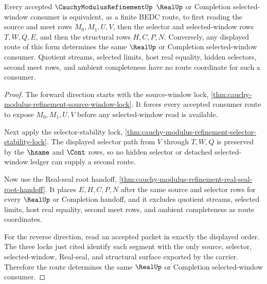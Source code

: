 \begin{theorem}
\label{thm:cauchy-modulus-refinement-root-window-exhaustion}
Every accepted $\CauchyModulusRefinementUp$ $\RealUp$ or Completion selected-window consumer is equivalent, as a finite BEDC route, to first reading the source and meet rows $M_0,M_1,U,V$, then the selector and selected-window rows $T,W,Q,E$, and then the structural rows $H,C,P,N$. Conversely, any displayed route of this form determines the same $\RealUp$ or Completion selected-window consumer. Quotient streams, selected limits, host real equality, hidden selectors, second meet rows, and ambient completeness have no route coordinate for such a consumer.
\end{theorem}
\begin{proof}
The forward direction starts with the source-window lock, \autoref{thm:cauchy-modulus-refinement-source-window-lock}. It forces every accepted consumer route to expose $M_0,M_1,U,V$ before any selected-window read is available.

Next apply the selector-stability lock, \autoref{thm:cauchy-modulus-refinement-selector-stability-lock}. The displayed selector path from $V$ through $T,W,Q$ is preserved by the $\hsame$ and $\Cont$ rows, so no hidden selector or detached selected-window ledger can supply a second route.

Now use the Real-seal root handoff, \autoref{thm:cauchy-modulus-refinement-real-seal-root-handoff}. It places $E,H,C,P,N$ after the same source and selector rows for every $\RealUp$ or Completion handoff, and it excludes quotient streams, selected limits, host real equality, second meet rows, and ambient completeness as route coordinates.

For the reverse direction, read an accepted packet in exactly the displayed order. The three locks just cited identify each segment with the only source, selector, selected-window, Real-seal, and structural surface exported by the carrier. Therefore the route determines the same $\RealUp$ or Completion selected-window consumer.
\end{proof}

